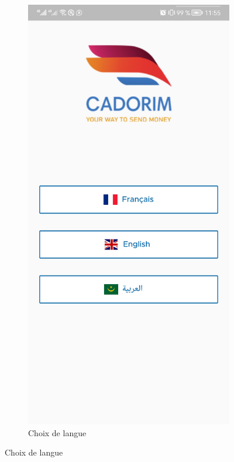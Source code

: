 \begin{itemize}[label=$\ast$]
\begin{figure}[!ht]
\begin{subfigure}{0.3\textwidth}
					\includegraphics[width=\hsize, valign=m ]{./Template LaTeX/Images/1.jpg}
					\caption{Choix de langue}
					\label{fig.SICAPI}
				\end{subfigure}

\end{figure}
\end{itemize}
